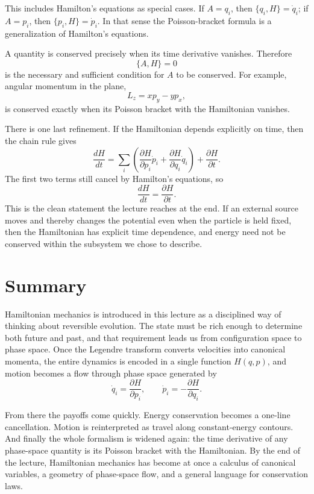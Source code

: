 This includes Hamilton's equations as special cases. If \(A=q_i\), then \(\{q_i,H\}=\dot q_i\); if \(A=p_i\), then \(\{p_i,H\}=\dot p_i\). In that sense the Poisson-bracket formula is a generalization of Hamilton's equations.

A quantity is conserved precisely when its time derivative vanishes. Therefore
\begin{equation}
\{A,H\}=0
\end{equation}
is the necessary and sufficient condition for \(A\) to be conserved. For example, angular momentum in the plane,
\begin{equation}
L_z=xp_y-yp_x,
\end{equation}
is conserved exactly when its Poisson bracket with the Hamiltonian vanishes.

There is one last refinement. If the Hamiltonian depends explicitly on time, then the chain rule gives
\begin{equation}
\frac{dH}{dt}
=
\sum_i
\left(
\frac{\partial H}{\partial p_i}\dot p_i
+
\frac{\partial H}{\partial q_i}\dot q_i
\right)
+
\frac{\partial H}{\partial t}.
\end{equation}
The first two terms still cancel by Hamilton's equations, so
\begin{equation}
\frac{dH}{dt}=\frac{\partial H}{\partial t}.
\end{equation}
This is the clean statement the lecture reaches at the end. If an external source moves and thereby changes the potential even when the particle is held fixed, then the Hamiltonian has explicit time dependence, and energy need not be conserved within the subsystem we chose to describe.

\section{Summary}

Hamiltonian mechanics is introduced in this lecture as a disciplined way of thinking about reversible evolution. The state must be rich enough to determine both future and past, and that requirement leads us from configuration space to phase space. Once the Legendre transform converts velocities into canonical momenta, the entire dynamics is encoded in a single function \(H(q,p)\), and motion becomes a flow through phase space generated by
\begin{equation}
\dot q_i=\frac{\partial H}{\partial p_i},
\qquad
\dot p_i=-\frac{\partial H}{\partial q_i}.
\end{equation}

From there the payoffs come quickly. Energy conservation becomes a one-line cancellation. Motion is reinterpreted as travel along constant-energy contours. And finally the whole formalism is widened again: the time derivative of any phase-space quantity is its Poisson bracket with the Hamiltonian. By the end of the lecture, Hamiltonian mechanics has become at once a calculus of canonical variables, a geometry of phase-space flow, and a general language for conservation laws.
